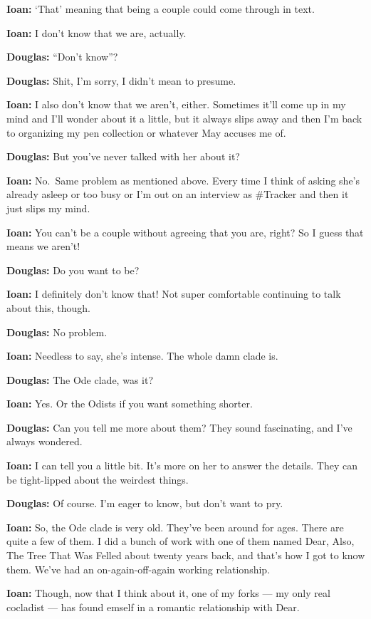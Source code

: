 \textbf{Ioan:} `That' meaning that being a couple could come through in text.

\textbf{Ioan:} I don't know that we are, actually.

\textbf{Douglas:} ``Don't know''?

\textbf{Douglas:} Shit, I'm sorry, I didn't mean to presume.

\textbf{Ioan:} I also don't know that we aren't, either. Sometimes it'll come up in my mind and I'll wonder about it a little, but it always slips away and then I'm back to organizing my pen collection or whatever May accuses me of.

\textbf{Douglas:} But you've never talked with her about it?

\textbf{Ioan:} No.~Same problem as mentioned above. Every time I think of asking she's already asleep or too busy or I'm out on an interview as \#Tracker and then it just slips my mind.

\textbf{Ioan:} You can't be a couple without agreeing that you are, right? So I guess that means we aren't!

\textbf{Douglas:} Do you want to be?

\textbf{Ioan:} I definitely don't know that! Not super comfortable continuing to talk about this, though.

\textbf{Douglas:} No problem.

\textbf{Ioan:} Needless to say, she's intense. The whole damn clade is.

\textbf{Douglas:} The Ode clade, was it?

\textbf{Ioan:} Yes. Or the Odists if you want something shorter.

\textbf{Douglas:} Can you tell me more about them? They sound fascinating, and I've always wondered.

\textbf{Ioan:} I can tell you a little bit. It's more on her to answer the details. They can be tight-lipped about the weirdest things.

\textbf{Douglas:} Of course. I'm eager to know, but don't want to pry.

\textbf{Ioan:} So, the Ode clade is very old. They've been around for ages. There are quite a few of them. I did a bunch of work with one of them named Dear, Also, The Tree That Was Felled about twenty years back, and that's how I got to know them. We've had an on-again-off-again working relationship.

\textbf{Ioan:} Though, now that I think about it, one of my forks — my only real cocladist — has found emself in a romantic relationship with Dear.

